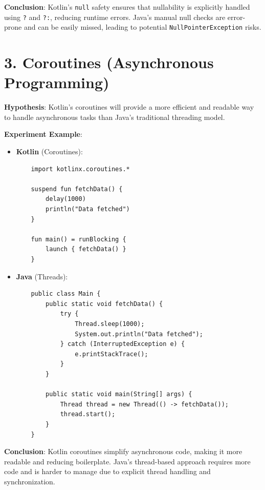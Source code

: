 \textbf{Conclusion}: Kotlin’s \texttt{null} safety ensures that nullability is explicitly handled using \texttt{?} and \texttt{?:}, reducing runtime errors. Java’s manual null checks are error-prone and can be easily missed, leading to potential \texttt{NullPointerException} risks.

\section*{3. Coroutines (Asynchronous Programming)}

\textbf{Hypothesis}: Kotlin’s coroutines will provide a more efficient and readable way to handle asynchronous tasks than Java’s traditional threading model.

\textbf{Experiment Example}:
\begin{itemize}
    \item \textbf{Kotlin} (Coroutines):
    \begin{verbatim}
    import kotlinx.coroutines.*

    suspend fun fetchData() {
        delay(1000)
        println("Data fetched")
    }

    fun main() = runBlocking {
        launch { fetchData() }
    }
    \end{verbatim}
    
    \item \textbf{Java} (Threads):
    \begin{verbatim}
    public class Main {
        public static void fetchData() {
            try {
                Thread.sleep(1000);
                System.out.println("Data fetched");
            } catch (InterruptedException e) {
                e.printStackTrace();
            }
        }

        public static void main(String[] args) {
            Thread thread = new Thread(() -> fetchData());
            thread.start();
        }
    }
    \end{verbatim}
\end{itemize}

\textbf{Conclusion}: Kotlin coroutines simplify asynchronous code, making it more readable and reducing boilerplate. Java’s thread-based approach requires more code and is harder to manage due to explicit thread handling and synchronization.

